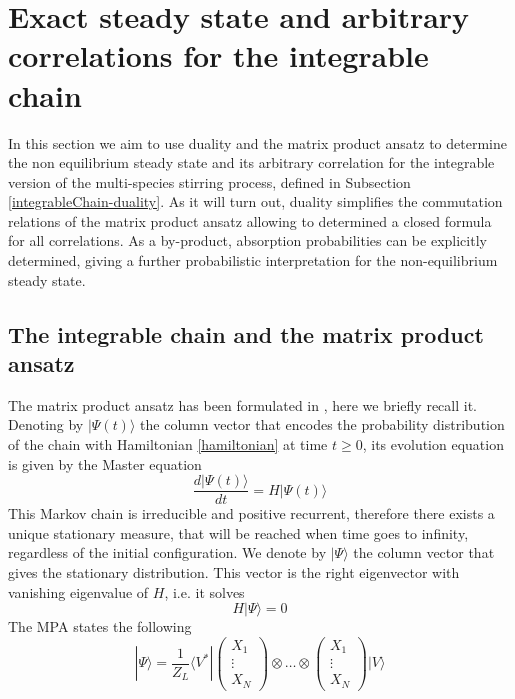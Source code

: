 \documentclass[10pt]{article}
\numberwithin{equation}{section}
\numberwithin{equation}{subsection}
\begin{document}
\section{Exact steady state and arbitrary correlations for the integrable chain}\label{sectionIntegrabiliy}
In this section we aim to use duality and the matrix product ansatz to determine the non equilibrium steady state and its arbitrary correlation for the integrable version of the multi-species stirring process, defined in Subsection \ref{integrableChain-duality}. As it will turn out, duality simplifies the commutation relations of the matrix product ansatz allowing to determined a closed formula for all correlations. As a by-product, absorption probabilities can be explicitly determined, giving a further probabilistic interpretation for the non-equilibrium steady state. 
\subsection{The integrable chain and the matrix product ansatz}
The matrix product ansatz has been formulated in \cite{vanicat2017exact}, here we briefly recall it.
 Denoting by $|\Psi(t)\rangle$ the column vector that encodes the probability distribution of the chain with Hamiltonian \eqref{hamiltonian} at time $t\geq 0$, its evolution equation is given by 
 the Master equation
\begin{equation}
    \frac{d|{\Psi}(t)\rangle}{dt}=H|{\Psi}(t)\rangle
\end{equation}
This Markov chain is irreducible and positive recurrent, therefore there exists a unique stationary measure, that will be reached when time goes to infinity, regardless of the initial configuration. 
We denote by $|\Psi\rangle$ the column vector that gives the stationary distribution. This vector is the right eigenvector with vanishing eigenvalue of $H$, i.e. it solves 
\begin{equation}\label{definition-SteadyStateH}
	H|\Psi\rangle =0
\end{equation}
The MPA states the following
\begin{equation}
	|\Psi\rangle=\frac{1}{Z_{L}}\langle V^{*}|\begin{pmatrix}
		X_{1}\\
		\vdots\\
		X_{N}
	\end{pmatrix}\otimes \ldots\otimes \begin{pmatrix}
		X_{1}\\
		\vdots\\
		X_{N}
	\end{pmatrix}|V\rangle
\end{equation}
\end{document}
